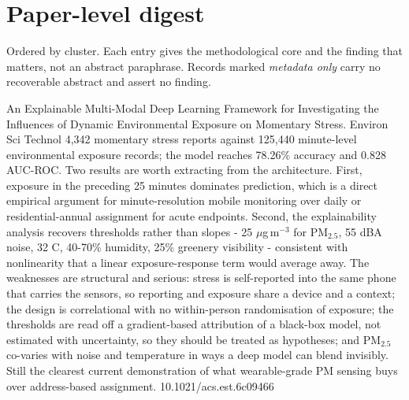 \documentclass[10pt]{article}
\begin{document}
\vspace{4mm}

\section*{\sffamily\bfseries\color{Deep}Paper-level digest}
\vspace{-1.5mm}{\color{Amber}\rule{\linewidth}{1.1pt}}\vspace{1mm}

{\fontsize{7.4}{9}\selectfont\color{Slate}Ordered by cluster. Each entry gives the
methodological core and the finding that matters, not an abstract paraphrase. Records
marked \textit{metadata only} carry no recoverable abstract and assert no finding.\par}


{An Explainable Multi-Modal Deep Learning Framework for Investigating the Influences of Dynamic Environmental Exposure on Momentary Stress.}
{Environ Sci Technol}
{4,342 momentary stress reports against 125,440 minute-level environmental exposure records; the model reaches 78.26\% accuracy and 0.828 AUC-ROC. Two results are worth extracting from the architecture. First, exposure in the preceding 25 minutes dominates prediction, which is a direct empirical argument for minute-resolution mobile monitoring over daily or residential-annual assignment for acute endpoints. Second, the explainability analysis recovers thresholds rather than slopes - 25 $\mu$g\,m$^{-3}$ for PM$_{2.5}$, 55 dBA noise, 32 C, 40-70\% humidity, 25\% greenery visibility - consistent with nonlinearity that a linear exposure-response term would average away. The weaknesses are structural and serious: stress is self-reported into the same phone that carries the sensors, so reporting and exposure share a device and a context; the design is correlational with no within-person randomisation of exposure; the thresholds are read off a gradient-based attribution of a black-box model, not estimated with uncertainty, so they should be treated as hypotheses; and PM$_{2.5}$ co-varies with noise and temperature in ways a deep model can blend invisibly. Still the clearest current demonstration of what wearable-grade PM sensing buys over address-based assignment.}
{10.1021/acs.est.6c09466}

\end{document}
